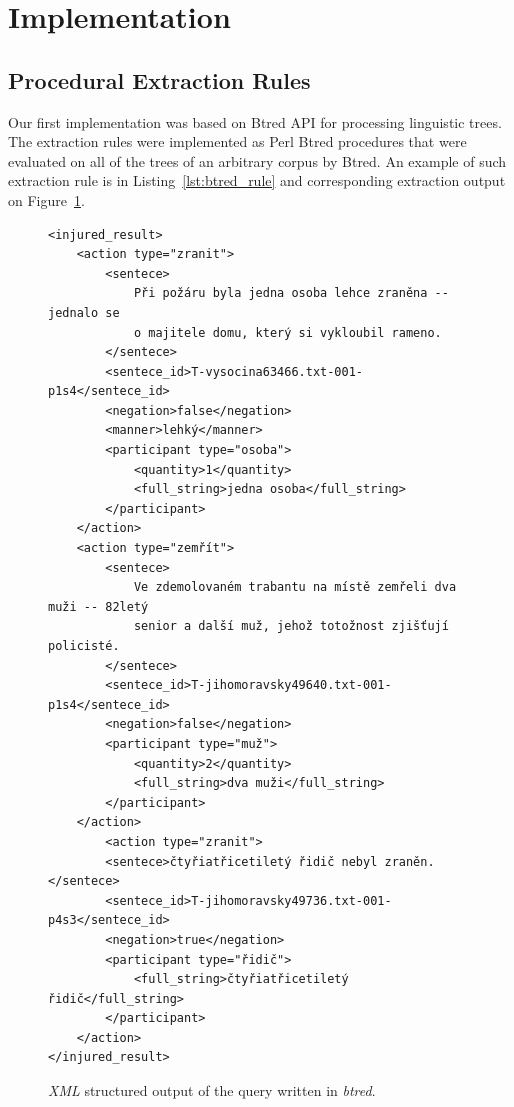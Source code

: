 \section{Implementation}

\subsection{Procedural Extraction Rules} \label{sec:ch50_Procedural_Extraction_Rules}

Our first implementation was based on Btred API for processing linguistic trees. The extraction rules were implemented as Perl Btred procedures that were evaluated on all of the trees of an arbitrary corpus by Btred. An example of such extraction rule is in Listing~\ref{lst:btred_rule} and corresponding extraction output on Figure~\ref{fig:btred_xml}.


\begin{figure}[ht]
\begin{verbatim}
<injured_result>
	<action type="zranit">
		<sentece>
			Při požáru byla jedna osoba lehce zraněna -- jednalo se
			o majitele domu, který si vykloubil rameno.
		</sentece>
		<sentece_id>T-vysocina63466.txt-001-p1s4</sentece_id>
		<negation>false</negation>
		<manner>lehký</manner>
		<participant type="osoba">
			<quantity>1</quantity>
			<full_string>jedna osoba</full_string>
		</participant>
	</action>
	<action type="zemřít">
		<sentece>
			Ve zdemolovaném trabantu na místě zemřeli dva muži -- 82letý
			senior a další muž, jehož totožnost zjišťují policisté.
		</sentece>
		<sentece_id>T-jihomoravsky49640.txt-001-p1s4</sentece_id>
		<negation>false</negation>
		<participant type="muž">
			<quantity>2</quantity>
			<full_string>dva muži</full_string>
		</participant>
	</action>
		<action type="zranit">
		<sentece>čtyřiatřicetiletý řidič nebyl zraněn.</sentece>
		<sentece_id>T-jihomoravsky49736.txt-001-p4s3</sentece_id>
		<negation>true</negation>
		<participant type="řidič">
			<full_string>čtyřiatřicetiletý řidič</full_string>
		</participant>
	</action>
</injured_result>
\end{verbatim}
\caption{\emph{XML} structured output of the query written in \emph{btred}.}
\label{fig:btred_xml}
\end{figure}




